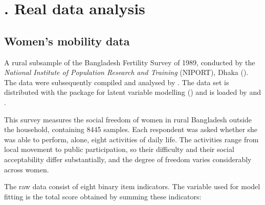 \section{$\!\!\!\!\!\!\!$. Real data analysis}    %

\subsection{Women's mobility data}      %

A rural subsample of the Bangladesh Fertility Survey of 1989, conducted by the \textit{National Institute of Population Research and Training} (NIPORT), Dhaka (\cite{HC1990}). The data were subsequently compiled and analysed by \textcite{GMBS2002}. The data set is distributed with the  package for latent variable modelling (\cite{Rizopoulos2006}) and is loaded by  and .

This survey measures the social freedom of women in rural Bangladesh outside the household, containing 8445 samples. Each respondent was asked whether she was able to perform, alone, eight activities of daily life. The activities range from local movement to public participation, so their difficulty and their social acceptability differ substantially, and the degree of freedom varies considerably across women. 

The raw data consist of eight binary item indicators. The variable used for model fitting is the total score
obtained by summing these indicators:

